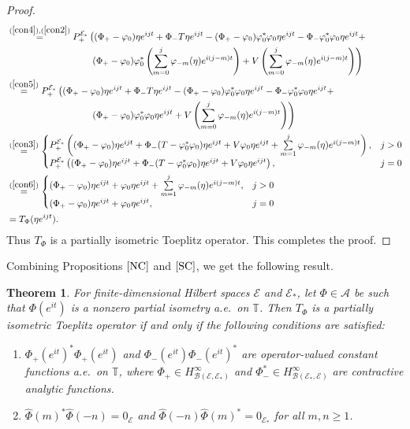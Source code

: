 \documentclass[12pt]{amsart}
\newcommand{\cla}{\mathcal{A}}
\newcommand{\clb}{\mathcal{B}}
\newcommand{\cle}{\mathcal{E}}
\newcommand{\T}{\mathbb{T}}
\theoremstyle{definition}
\theoremstyle{plain}
\newtheorem{thm}{Theorem}[section]
\theoremstyle{definition}
\numberwithin{equation}{section}
\let\phi=\varphi
\begin{document}
\begin{proof}
\begin{align*}
&\stackrel{(\ref{con4}),(\ref{con2})}{=}P_+^{\cle_*}\left((\Phi_+-\phi_0)\eta e^{ijt}+\Phi_-T\eta e^{ijt}-(\Phi_+-\phi_0)\phi_0^*\phi_0\eta e^{ijt}-\Phi_-\phi_0^*\phi_0\eta e^{ijt}+\right.\\
&\quad\quad\quad\quad\quad\quad\quad\quad\quad\left.(\Phi_+-\phi_0)\phi_0^*\left(\sum\limits_{m=0}^j\phi_{-m}(\eta)e^{i(j-m)t}\right)+V\left(\sum\limits_{m=0}^j\phi_{-m}(\eta)e^{i(j-m)t}\right)\right)\\
&\stackrel{(\ref{con5})}{=}P_+^{\cle_*}\left((\Phi_+-\phi_0)\eta e^{ijt}+\Phi_-T\eta e^{ijt}-(\Phi_+-\phi_0)\phi_0^*\phi_0\eta e^{ijt}-\Phi_-\phi_0^*\phi_0\eta e^{ijt}+\right.\\
&\quad\quad\quad\quad\quad\quad\quad\quad\quad\left.(\Phi_+-\phi_0)\phi_0^*\phi_0\eta e^{ijt}+V\left(\sum\limits_{m=0}^j\phi_{-m}(\eta)e^{i(j-m)t}\right)\right)\\
&\stackrel{(\ref{con3})}{=}\begin{cases}
	 P_+^{\cle_*}\left((\Phi_+-\phi_0)\eta e^{ijt}+\Phi_-(T-\phi_0^*\phi_0)\eta e^{ijt} + V\phi_0\eta e^{ijt}+\sum\limits_{m=1}^j\phi_{-m}(\eta)e^{i(j-m)t}\right),& j>0\\
	 P_+^{\cle_*}\left((\Phi_+-\phi_0)\eta e^{ijt}+\Phi_-(T-\phi_0^*\phi_0)\eta e^{ijt} + V\phi_0\eta e^{ijt}\right), & j = 0 
\end{cases} \\
&\stackrel{(\ref{con6})}{=}\begin{cases}
	 (\Phi_+-\phi_0)\eta e^{ijt}+ \phi_0\eta e^{ijt}+\sum\limits_{m=1}^j\phi_{-m}(\eta)e^{i(j-m)t}, & j>0\\
	 (\Phi_+-\phi_0)\eta e^{ijt}+ \phi_0\eta e^{ijt}, & j =0
	\end{cases}\\
&=T_\Phi(\eta e^{ijt}).
\end{align*}
Thus $T_\Phi$ is a partially isometric Toeplitz operator. This completes the proof.
\end{proof}


Combining Propositions $\ref{NC}$ and $\ref{SC}$, we get the following result.

\begin{thm}\label{Characterization-Partial}
For finite-dimensional Hilbert spaces $\cle$ and $\cle_*$, let $\Phi \in \cla$ be such that $\Phi(e^{it})$ is a nonzero partial isometry a.e.\ on $\T$. Then $T_\Phi$ is a partially isometric Toeplitz operator if and only if the following conditions are satisfied:
\begin{enumerate}
\item  $\Phi_+(e^{it})^*\Phi_+(e^{it}) $ and $\Phi_-(e^{it})\Phi_-(e^{it})^*$
are  operator-valued constant functions a.e.\ on $\T$, where $\Phi_+ \in H^\infty_{\clb(\cle,\cle_*)}$ and $\Phi_-^* \in H^\infty_{\clb(\cle_*,\cle)}$ are contractive analytic functions.
\item  $\hat{\Phi}(m)^*\hat{\Phi}(-n)=0_\cle$ and $\hat{\Phi}(-n)\hat{\Phi}(m)^*=0_{\cle_*}$ for all $m,n \geq 1$.
\end{enumerate}
\end{thm}
\end{document}

